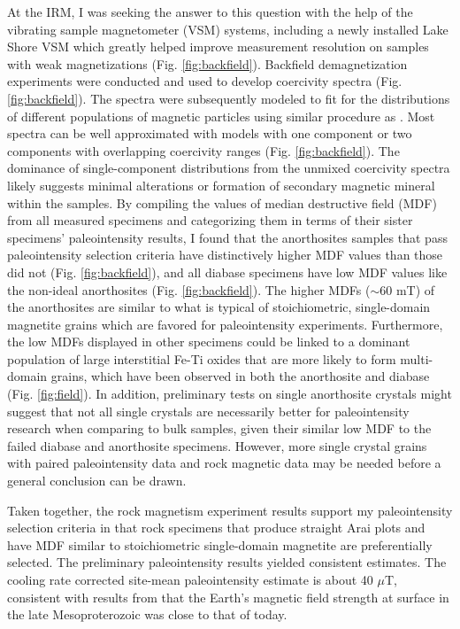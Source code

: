 \documentclass[draft]{agujournal2019}
\begin{document}
At the IRM, I was seeking the answer to this question with the help of the vibrating sample magnetometer (VSM) systems, including a newly installed Lake Shore VSM which greatly helped improve measurement resolution on samples with weak magnetizations (Fig. \ref{fig:backfield}). Backfield demagnetization experiments were conducted and used to develop coercivity spectra (Fig. \ref{fig:backfield}). The spectra were subsequently modeled to fit for the distributions of different  populations of magnetic particles using similar procedure as \cite{Maxbauer2016a}. Most spectra can be well approximated with models with one component or two components with overlapping coercivity ranges (Fig. \ref{fig:backfield}). The dominance of single-component distributions from the unmixed coercivity spectra likely suggests minimal alterations or formation of secondary magnetic mineral within the samples. By compiling the values of median destructive field (MDF) from all measured specimens and categorizing them in terms of their sister specimens' paleointensity results, I found that the anorthosites samples that pass paleointensity selection criteria have distinctively higher MDF values than those did not (Fig. \ref{fig:backfield}), and all diabase specimens have low MDF values like the non-ideal anorthosites (Fig. \ref{fig:backfield}). The higher MDFs ($\sim$60 mT) of the anorthosites are similar to what is typical of stoichiometric, single-domain magnetite grains which are favored for paleointensity experiments. Furthermore, the low MDFs displayed in other specimens could be linked to a dominant population of large interstitial Fe-Ti oxides that are more likely to form multi-domain grains, which have been observed in both the anorthosite and diabase (Fig. \ref{fig:field}). In addition, preliminary tests on single anorthosite crystals might suggest that not all single crystals are necessarily better for paleointensity research when comparing to bulk samples, given their similar low MDF to the failed diabase and anorthosite specimens. However, more single crystal grains with paired paleointensity data and rock magnetic data may be needed before a general conclusion can be drawn. 

Taken together, the rock magnetism experiment results support my paleointensity selection criteria in that rock specimens that produce straight Arai plots and have MDF similar to stoichiometric single-domain magnetite are preferentially selected. The preliminary paleointensity results yielded consistent estimates. The cooling rate corrected site-mean paleointensity estimate is about 40 $\mu$T, consistent with results from \cite{Sprain2018a} that the Earth's magnetic field strength at surface in the late Mesoproterozoic was close to that of today. 
\end{document}
